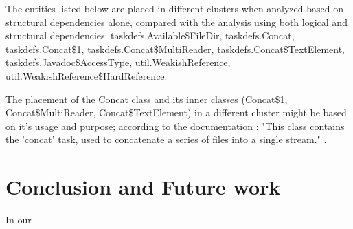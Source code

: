 \documentclass[conference]{IEEEtran}
\begin{document}
The entities listed below are placed in different clusters when analyzed based on structural dependencies alone, compared with the analysis using both logical and structural dependencies: taskdefs.Available\$FileDir, taskdefs.Concat, taskdefs.Concat\$1, taskdefs.Concat\$MultiReader, taskdefs.Concat\$TextElement, taskdefs.Javadoc\$AccessType, util.WeakishReference, util.WeakishReference\$HardReference.

The placement of the Concat class and its inner classes (Concat\$1, Concat\$MultiReader, Concat\$TextElement) in a different cluster might be based on it's usage and purpose; according to the documentation : "This class contains the 'concat' task, used to concatenate a series of files into a single stream." \cite{ant_concat}.

\section{Conclusion and Future work}

In our 



\end{document}
